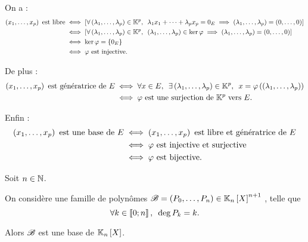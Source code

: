 \begin{dem}
On a : \[\begin{aligned}
\paren{x_1,\dots,x_p}\text{ est libre}&\ssi\croch{\quantifs{\forall\paren{\lambda_1,\dots,\lambda_p}\in\K^p}\lambda_1x_1+\dots+\lambda_px_p=0_E\imp\paren{\lambda_1,\dots,\lambda_p}=\paren{0,\dots,0}} \\
&\ssi\croch{\quantifs{\forall\paren{\lambda_1,\dots,\lambda_p}\in\K^p}\paren{\lambda_1,\dots,\lambda_p}\in\ker\phi\imp\paren{\lambda_1,\dots,\lambda_p}=\paren{0,\dots,0}} \\
&\ssi\ker\phi=\accol{0_E} \\
&\ssi\phi\text{ est injective}.
\end{aligned}\]

De plus : \[\begin{aligned}
\paren{x_1,\dots,x_p}\text{ est génératrice de }E&\ssi\quantifs{\forall x\in E;\exists\paren{\lambda_1,\dots,\lambda_p}\in\K^p}x=\phi\paren{\paren{\lambda_1,\dots,\lambda_p}} \\
&\ssi\phi\text{ est une surjection de }\K^p\text{ vers }E.
\end{aligned}\]

Enfin : \[\begin{aligned}
\left(x_1,\dots,x_p\right)\text{ est une base de }E&\iff\left(x_1,\dots,x_p\right)\text{ est libre et génératrice de }E \\
&\iff\varphi\text{ est injective et surjective} \\
&\iff\varphi\text{ est bijective}.
\end{aligned}\]
\end{dem}

\begin{prop}
Soit \(n\in\mathbb{N}\).

On considère une famille de polynômes \(\fami{B}=\paren{P_0,\dots,P_n}\in\polydeg{n}^{n+1}\) , \cad telle que \[\quantifs{\forall k\in\interventierii{0}{n}}\deg P_k=k.\]

Alors \(\mathscr{B}\) est une base de \(\polydeg{n}\).
\end{prop}

